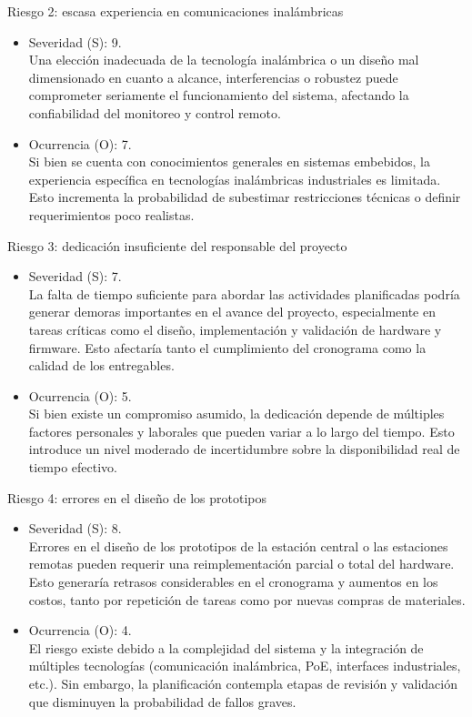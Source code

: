 \documentclass[
11pt, %
]{charter}
\begin{document}
Riesgo 2: escasa experiencia en comunicaciones inalámbricas
\begin{itemize}
	\item Severidad (S): 9.\\ Una elección inadecuada de la tecnología inalámbrica o un diseño mal dimensionado en cuanto a alcance, interferencias o robustez puede comprometer seriamente el funcionamiento del sistema, afectando la confiabilidad del monitoreo y control remoto.
	\item Ocurrencia (O): 7.\\ Si bien se cuenta con conocimientos generales en sistemas embebidos, la experiencia específica en tecnologías inalámbricas industriales es limitada. Esto incrementa la probabilidad de subestimar restricciones técnicas o definir requerimientos poco realistas.
\end{itemize}

Riesgo 3: dedicación insuficiente del responsable del proyecto
\begin{itemize}
	\item Severidad (S):  7.\\	La falta de tiempo suficiente para abordar las actividades planificadas podría generar demoras importantes en el avance del proyecto, especialmente en tareas críticas como el diseño, implementación y validación de hardware y firmware. Esto afectaría tanto el cumplimiento del cronograma como la calidad de los entregables.
	\item Ocurrencia (O): 5.\\	Si bien existe un compromiso asumido, la dedicación depende de múltiples factores personales y laborales que pueden variar a lo largo del tiempo. Esto introduce un nivel moderado de incertidumbre sobre la disponibilidad real de tiempo efectivo.
\end{itemize}

Riesgo 4: errores en el diseño de los prototipos
\begin{itemize}
	\item Severidad (S):  8.\\	Errores en el diseño de los prototipos de la estación central o las estaciones remotas pueden requerir una reimplementación parcial o total del hardware. Esto generaría retrasos considerables en el cronograma y aumentos en los costos, tanto por repetición de tareas como por nuevas compras de materiales.
	\item Ocurrencia (O): 4.\\	El riesgo existe debido a la complejidad del sistema y la integración de múltiples tecnologías (comunicación inalámbrica, PoE, interfaces industriales, etc.). Sin embargo, la planificación contempla etapas de revisión y validación que disminuyen la probabilidad de fallos graves.
\end{itemize}
\end{document}
